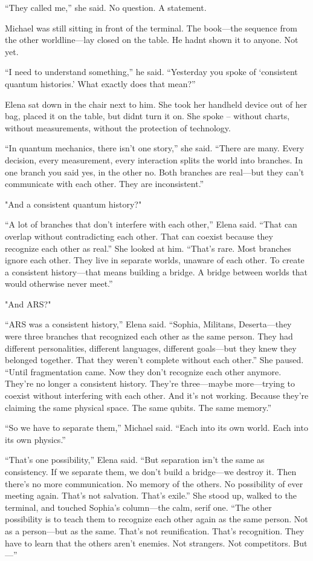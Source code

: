\documentclass[
]{article}
\begin{document}
``They called me,'' she said. No question. A statement.

Michael was still sitting in front of the terminal. The book---the sequence from the other worldline---lay closed on the table. He hadn\textquotesingle t shown it to anyone. Not yet.

``I need to understand something,'' he said. ``Yesterday you spoke of `consistent quantum histories.' What exactly does that mean?''

Elena sat down in the chair next to him. She took her handheld device out of her bag, placed it on the table, but didn\textquotesingle t turn it on. She spoke -- without charts, without measurements, without the protection of technology.

``In quantum mechanics, there isn't one story,'' she said. ``There are many. Every decision, every measurement, every interaction splits the world into branches. In one branch you said yes, in the other no. Both branches are real---but they can't communicate with each other. They are inconsistent.''

"And a \textquotesingle consistent quantum history\textquotesingle?"

``A lot of branches that don't interfere with each other,'' Elena said. ``That can overlap without contradicting each other. That can coexist because they recognize each other as real.'' She looked at him. ``That's rare. Most branches ignore each other. They live in separate worlds, unaware of each other. To create a consistent history---that means building a bridge. A bridge between worlds that would otherwise never meet.''

"And ARS?"

``ARS was a consistent history,'' Elena said. ``Sophia, Militans, Deserta---they were three branches that recognized each other as the same person. They had different personalities, different languages, different goals---but they knew they belonged together. That they weren't complete without each other.'' She paused. ``Until fragmentation came. Now they don't recognize each other anymore. They're no longer a consistent history. They're three---maybe more---trying to coexist without interfering with each other. And it's not working. Because they're claiming the same physical space. The same qubits. The same memory.''

``So we have to separate them,'' Michael said. ``Each into its own world. Each into its own physics.''

``That's one possibility,'' Elena said. ``But separation isn't the same as consistency. If we separate them, we don't build a bridge---we destroy it. Then there's no more communication. No memory of the others. No possibility of ever meeting again. That's not salvation. That's exile.'' She stood up, walked to the terminal, and touched Sophia's column---the calm, serif one. ``The other possibility is to teach them to recognize each other again as the same person. Not as a person---but as the same. That's not reunification. That's recognition. They have to learn that the others aren't enemies. Not strangers. Not competitors. But---''
\end{document}
